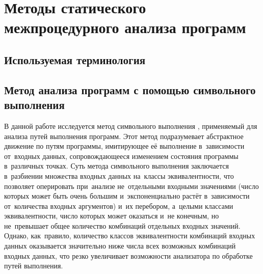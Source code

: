 \chapter{Методы статического межпроцедурного анализа программ} \label{chapt1}


\section{Используемая терминология}



\section{Метод анализа программ с помощью символьного выполнения} \label{sect1_1}
В данной работе исследуется метод символьного выполнения \cite{king76}, применяемый для анализа путей выполнения программ. Этот метод подразумевает абстрактное движение по путям программы, имитирующее её выполнение в~зависимости от~входных данных, сопровождающееся изменением состояния программы в~различных точках. Суть метода символьного выполнения заключается в~разбиении множества входных данных на~классы эквивалентности, что позволяет оперировать при~анализе не~отдельными входными значениями (число которых может быть очень большим и~экспоненциально растёт в~зависимости от~количества входных аргументов) и~их перебором, а~целыми классами эквивалентности, число которых может оказаться и~не конечным, но не~превышает общее количество комбинаций отдельных входных значений. Однако, как~правило, количество классов эквивалентности комбинаций входных данных оказывается значительно ниже числа всех возможных комбинаций входных данных, что резко увеличивает возможности анализатора по обработке путей выполнения.


